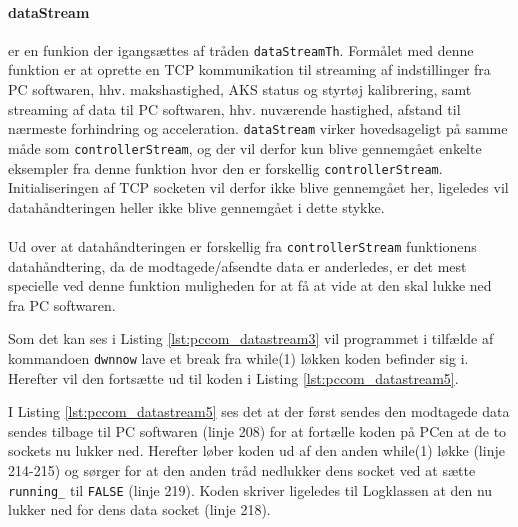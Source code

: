\paragraph{dataStream} er en funkion der igangsættes af tråden \texttt{dataStreamTh}. Formålet med denne funktion er at oprette en TCP kommunikation til streaming af indstillinger fra PC softwaren, hhv. makshastighed, AKS status og styrtøj kalibrering, samt streaming af data til PC softwaren, hhv. nuværende hastighed, afstand til nærmeste forhindring og acceleration. \texttt{dataStream} virker hovedsageligt på samme måde som \texttt{controllerStream}, og der vil derfor kun blive gennemgået enkelte eksempler fra denne funktion hvor den er forskellig \texttt{controllerStream}. Initialiseringen af TCP socketen vil derfor ikke blive gennemgået her, ligeledes vil datahåndteringen heller ikke blive gennemgået i dette stykke.\\\\
Ud over at datahåndteringen er forskellig fra \texttt{controllerStream} funktionens datahåndtering, da de modtagede/afsendte data er anderledes, er det mest specielle ved denne funktion muligheden for at få at vide at den skal lukke ned fra PC softwaren. 



Som det kan ses i Listing \ref{lst:pccom_datastream3} vil programmet i tilfælde af kommandoen \texttt{dwnnow} lave et break fra while(1) løkken koden befinder sig i. Herefter vil den fortsætte ud til koden i Listing \ref{lst:pccom_datastream5}.



I Listing \ref{lst:pccom_datastream5} ses det at der først sendes den modtagede data sendes tilbage til PC softwaren (linje 208) for at fortælle koden på PCen at de to sockets nu lukker ned. Herefter løber koden ud af den anden while(1) løkke (linje 214-215) og sørger for at den anden tråd nedlukker dens socket ved at sætte \texttt{running\_} til \texttt{FALSE} (linje 219). Koden skriver ligeledes til Logklassen at den nu lukker ned for dens data socket (linje 218).

\clearpage

